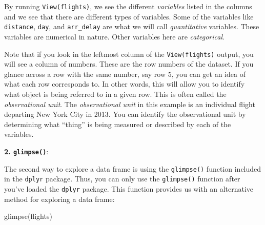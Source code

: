 \documentclass[
  letterpaper,
  DIV=11,
  numbers=noendperiod]{scrreprt}
\newenvironment{Shaded}{\begin{snugshade}}{\end{snugshade}}
\newcommand{\FunctionTok}[1]{\textcolor[rgb]{0.28,0.35,0.67}{#1}}
\newcommand{\NormalTok}[1]{\textcolor[rgb]{0.00,0.23,0.31}{#1}}
\theoremstyle{definition}
\theoremstyle{remark}
\begin{document}
By running \texttt{View(flights)}, we see the different \emph{variables}
listed in the columns and we see that there are different types of
variables. Some of the variables like \texttt{distance}, \texttt{day},
and \texttt{arr\_delay} are what we will call \emph{quantitative}
variables. These variables are numerical in nature. Other variables here
are \emph{categorical}.

Note that if you look in the leftmost column of the
\texttt{View(flights)} output, you will see a column of numbers. These
are the row numbers of the dataset. If you glance across a row with the
same number, say row 5, you can get an idea of what each row corresponds
to. In other words, this will allow you to identify what object is being
referred to in a given row. This is often called the \emph{observational
unit}. The \emph{observational unit} in this example is an individual
flight departing New York City in 2013. You can identify the
observational unit by determining what ``thing'' is being measured or
described by each of the variables.

\textbf{2. \texttt{glimpse()}}:

The second way to explore a data frame is using the \texttt{glimpse()}
function included in the \texttt{dplyr} package. Thus, you can only use
the \texttt{glimpse()} function after you've loaded the \texttt{dplyr}
package. This function provides us with an alternative method for
exploring a data frame:

\begin{Shaded}
\begin{Highlighting}[]
\FunctionTok{glimpse}\NormalTok{(flights)}
\end{Highlighting}
\end{Shaded}
\end{document}

